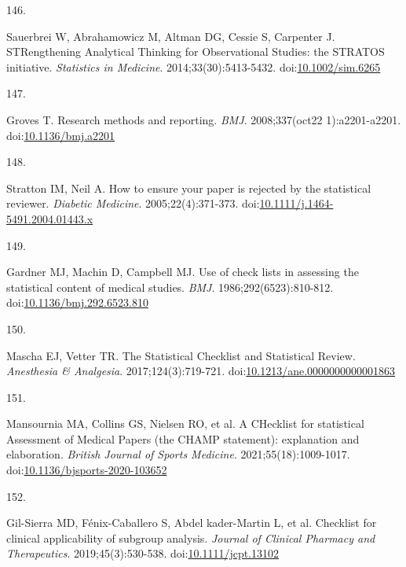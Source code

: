 \documentclass[
]{book}
\newlength{\cslhangindent}
\newlength{\csllabelwidth}
\newlength{\cslentryspacingunit} %
\newenvironment{CSLReferences}[2] %
 {%
  \setlength{\parindent}{0pt}
  \ifodd #1
  \let\oldpar\par
  \def\par{\hangindent=\cslhangindent\oldpar}
  \fi
  \setlength{\parskip}{#2\cslentryspacingunit}
 }%
 {}
\newcommand{\CSLLeftMargin}[1]{\parbox[t]{\csllabelwidth}{#1}}
\newcommand{\CSLRightInline}[1]{\parbox[t]{\linewidth - \csllabelwidth}{#1}\break}
\begin{document}
\begin{CSLReferences}{0}{0}
\leavevmode{}%
\CSLLeftMargin{146. }%
\CSLRightInline{Sauerbrei W, Abrahamowicz M, Altman DG, Cessie S, Carpenter J. STRengthening Analytical Thinking for Observational Studies: the STRATOS initiative. \emph{Statistics in Medicine}. 2014;33(30):5413-5432. doi:\href{https://doi.org/10.1002/sim.6265}{10.1002/sim.6265}}

\leavevmode{}%
\CSLLeftMargin{147. }%
\CSLRightInline{Groves T. Research methods and reporting. \emph{BMJ}. 2008;337(oct22 1):a2201-a2201. doi:\href{https://doi.org/10.1136/bmj.a2201}{10.1136/bmj.a2201}}

\leavevmode{}%
\CSLLeftMargin{148. }%
\CSLRightInline{Stratton IM, Neil A. How to ensure your paper is rejected by the statistical reviewer. \emph{Diabetic Medicine}. 2005;22(4):371-373. doi:\href{https://doi.org/10.1111/j.1464-5491.2004.01443.x}{10.1111/j.1464-5491.2004.01443.x}}

\leavevmode{}%
\CSLLeftMargin{149. }%
\CSLRightInline{Gardner MJ, Machin D, Campbell MJ. Use of check lists in assessing the statistical content of medical studies. \emph{BMJ}. 1986;292(6523):810-812. doi:\href{https://doi.org/10.1136/bmj.292.6523.810}{10.1136/bmj.292.6523.810}}

\leavevmode{}%
\CSLLeftMargin{150. }%
\CSLRightInline{Mascha EJ, Vetter TR. The Statistical Checklist and Statistical Review. \emph{Anesthesia \& Analgesia}. 2017;124(3):719-721. doi:\href{https://doi.org/10.1213/ane.0000000000001863}{10.1213/ane.0000000000001863}}

\leavevmode{}%
\CSLLeftMargin{151. }%
\CSLRightInline{Mansournia MA, Collins GS, Nielsen RO, et al. A CHecklist for statistical Assessment of Medical Papers (the CHAMP statement): explanation and elaboration. \emph{British Journal of Sports Medicine}. 2021;55(18):1009-1017. doi:\href{https://doi.org/10.1136/bjsports-2020-103652}{10.1136/bjsports-2020-103652}}

\leavevmode{}%
\CSLLeftMargin{152. }%
\CSLRightInline{Gil-Sierra MD, Fénix-Caballero S, Abdel kader-Martin L, et al. Checklist for clinical applicability of subgroup analysis. \emph{Journal of Clinical Pharmacy and Therapeutics}. 2019;45(3):530-538. doi:\href{https://doi.org/10.1111/jcpt.13102}{10.1111/jcpt.13102}}


\end{CSLReferences}
\end{document}
